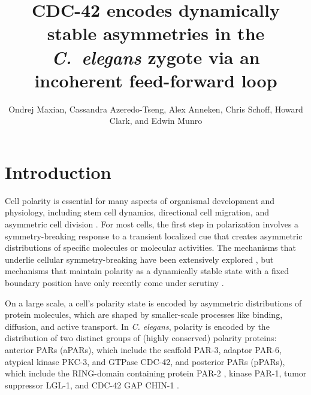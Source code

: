 \documentclass[11pt]{article}
\title{CDC-42 encodes dynamically stable asymmetries in the \emph{C.\ elegans} zygote via an incoherent feed-forward loop}
\author{Ondrej Maxian, Cassandra Azeredo-Tseng, Alex Anneken, Chris Schoff, Howard Clark, and Edwin Munro \vspace{-0.75 cm}}
\newcommand{\6}[1]{#1_{\text{6}}}
\newcommand{\3}[1]{#1_{\text{3}}}
\begin{document}
\maketitle

\section*{Introduction}
Cell polarity is essential for many aspects of organismal development and physiology, including stem cell dynamics, directional cell migration, and asymmetric cell division \citep{dewey2015cell, goldstein2007proteins, ierushalmi2021cytoskeletal, maitre2016asymmetric}. For most cells, the first step in polarization involves a symmetry-breaking response to a transient localized cue that creates asymmetric distributions of specific molecules or molecular activities. The mechanisms that underlie cellular symmetry-breaking have been extensively explored \citep{li2010symmetry}, but mechanisms that maintain polarity as a dynamically stable state with a fixed boundary position have only recently come under scrutiny \citep{sailer2015dynamic, gross2019guiding}.

On a large scale, a cell's polarity state is encoded by asymmetric distributions of protein molecules, which are shaped by smaller-scale processes like binding, diffusion, and active transport. In \emph{C. elegans}, polarity is encoded by the distribution of two distinct groups of (highly conserved) polarity proteins: anterior PARs (aPARs), which include the scaffold PAR-3, adaptor PAR-6, atypical kinase PKC-3, and GTPase CDC-42, and posterior PARs (pPARs), which include the RING-domain containing protein PAR-2 \citep{bland2023optimized}, kinase PAR-1, tumor suppressor LGL-1, and CDC-42 GAP CHIN-1 \citep{lang2017proteins}. 
\end{document}
